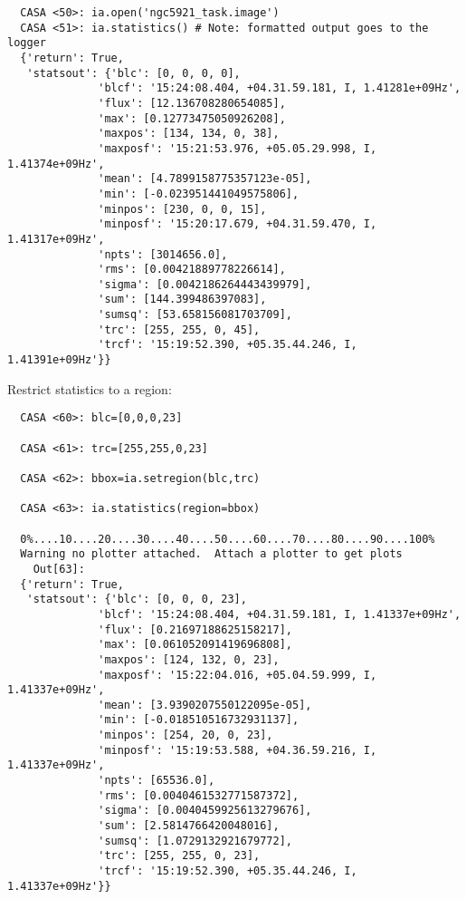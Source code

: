 \small
\begin{verbatim}
  CASA <50>: ia.open('ngc5921_task.image')
  CASA <51>: ia.statistics() # Note: formatted output goes to the logger
  {'return': True,
   'statsout': {'blc': [0, 0, 0, 0],
              'blcf': '15:24:08.404, +04.31.59.181, I, 1.41281e+09Hz',
              'flux': [12.136708280654085],
              'max': [0.12773475050926208],
              'maxpos': [134, 134, 0, 38],
              'maxposf': '15:21:53.976, +05.05.29.998, I, 1.41374e+09Hz',
              'mean': [4.7899158775357123e-05],
              'min': [-0.023951441049575806],
              'minpos': [230, 0, 0, 15],
              'minposf': '15:20:17.679, +04.31.59.470, I, 1.41317e+09Hz',
              'npts': [3014656.0],
              'rms': [0.00421889778226614],
              'sigma': [0.0042186264443439979],
              'sum': [144.399486397083],
              'sumsq': [53.658156081703709],
              'trc': [255, 255, 0, 45],
              'trcf': '15:19:52.390, +05.35.44.246, I, 1.41391e+09Hz'}}
\end{verbatim}
\normalsize

Restrict statistics to a region:

\small
\begin{verbatim}
  CASA <60>: blc=[0,0,0,23]

  CASA <61>: trc=[255,255,0,23]

  CASA <62>: bbox=ia.setregion(blc,trc)

  CASA <63>: ia.statistics(region=bbox)

  0%....10....20....30....40....50....60....70....80....90....100%
  Warning no plotter attached.  Attach a plotter to get plots
    Out[63]: 
  {'return': True,
   'statsout': {'blc': [0, 0, 0, 23],
              'blcf': '15:24:08.404, +04.31.59.181, I, 1.41337e+09Hz',
              'flux': [0.21697188625158217],
              'max': [0.061052091419696808],
              'maxpos': [124, 132, 0, 23],
              'maxposf': '15:22:04.016, +05.04.59.999, I, 1.41337e+09Hz',
              'mean': [3.9390207550122095e-05],
              'min': [-0.018510516732931137],
              'minpos': [254, 20, 0, 23],
              'minposf': '15:19:53.588, +04.36.59.216, I, 1.41337e+09Hz',
              'npts': [65536.0],
              'rms': [0.0040461532771587372],
              'sigma': [0.0040459925613279676],
              'sum': [2.5814766420048016],
              'sumsq': [1.0729132921679772],
              'trc': [255, 255, 0, 23],
              'trcf': '15:19:52.390, +05.35.44.246, I, 1.41337e+09Hz'}}
\end{verbatim}
\normalsize

